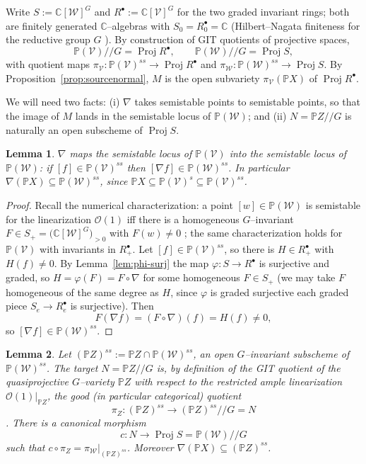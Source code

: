 \documentclass{amsart}
\newtheorem{lemma}{Lemma}
\theoremstyle{definition}
\DeclareMathOperator{\Proj}{Proj}
\newcommand{\PP}{\mathbb{P}}
\newcommand{\CC}{\mathbb{C}}
\newcommand{\nab}{\nabla}
\begin{document}
Write $S:=\CC[\mathcal W]^{G}$ and $R^{\bullet}:=\CC[\mathcal V]^{G}$ for the two graded
invariant rings; both are finitely generated $\CC$--algebras with $S_0=R^{\bullet}_0=\CC$
(Hilbert--Nagata finiteness for the reductive group $G$ \cite[Ch.~1, \S 2, Thm.~1.1]{MFK}).
By construction of GIT quotients of projective spaces,
\[
\PP(\mathcal V)/\!/G=\Proj R^{\bullet},\qquad \PP(\mathcal W)/\!/G=\Proj S ,
\]
with quotient maps $\pi_{\mathcal V}\colon\PP(\mathcal V)^{ss}\to\Proj R^{\bullet}$ and
$\pi_{\mathcal W}\colon\PP(\mathcal W)^{ss}\to\Proj S$. By Proposition~\ref{prop:sourcenormal},
$M$ is the open subvariety $\pi_{\mathcal V}(\PP X)$ of $\Proj R^{\bullet}$.

We will need two facts: (i) $\nab$ takes semistable points to semistable points, so that the
image of $M$ lands in the semistable locus of $\PP(\mathcal W)$; and (ii) $N=\PP Z/\!/G$ is
naturally an open subscheme of $\Proj S$.

\begin{lemma}\label{lem:ss-to-ss}
$\nab$ maps the semistable locus of $\PP(\mathcal V)$ into the semistable locus of
$\PP(\mathcal W)$: if $[f]\in\PP(\mathcal V)^{ss}$ then $[\nab f]\in\PP(\mathcal W)^{ss}$. In
particular $\nab(\PP X)\subseteq\PP(\mathcal W)^{ss}$, since
$\PP X\subseteq\PP(\mathcal V)^{s}\subseteq\PP(\mathcal V)^{ss}$.
\end{lemma}

\begin{proof}
Recall the numerical characterization: a point $[w]\in\PP(\mathcal W)$ is semistable for the
linearization $\mathcal O(1)$ iff there is a homogeneous $G$--invariant $F\in S_{+}=
\big(\CC[\mathcal W]^{G}\big)_{>0}$ with $F(w)\neq 0$ \cite[Ch.~1, \S 4, Thm.~1.10 and
Def.~1.7]{MFK}; the same characterization holds for $\PP(\mathcal V)$ with invariants in
$R^{\bullet}_{+}$. Let $[f]\in\PP(\mathcal V)^{ss}$, so there is $H\in R^{\bullet}_{+}$ with
$H(f)\neq 0$. By Lemma~\ref{lem:phi-surj} the map $\varphi\colon S\to R^{\bullet}$ is
surjective and graded, so $H=\varphi(F)=F\circ\nab$ for some homogeneous
$F\in S_{+}$ (we may take $F$ homogeneous of the same degree as $H$, since $\varphi$ is graded
surjective each graded piece $S_e\to R^\bullet_e$ is surjective). Then
\[
F(\nab f)=(F\circ\nab)(f)=H(f)\neq 0 ,
\]
so $[\nab f]\in\PP(\mathcal W)^{ss}$.
\end{proof}

\begin{lemma}\label{lem:Ncat}
Let $(\PP Z)^{ss}:=\PP Z\cap\PP(\mathcal W)^{ss}$, an open $G$--invariant subscheme of
$\PP(\mathcal W)^{ss}$. The target $N=\PP Z/\!/G$ is, by definition of the GIT quotient of the
quasiprojective $G$--variety $\PP Z$ with respect to the restricted ample linearization
$\mathcal O(1)|_{\PP Z}$, the \emph{good} \textup{(}in particular categorical\textup{)}
quotient
\[
\pi_Z\colon (\PP Z)^{ss}\longrightarrow (\PP Z)^{ss}/\!/G=N
\]
\textup{\cite[Ch.~1, \S 4, Thm.~1.10 and the construction of $/\!/$ for invariant opens]{MFK}}.
There is a canonical morphism
\[
c\colon N\longrightarrow \Proj S=\PP(\mathcal W)/\!/G
\]
such that $c\circ\pi_Z=\pi_{\mathcal W}|_{(\PP Z)^{ss}}$. Moreover
$\nab(\PP X)\subseteq (\PP Z)^{ss}$.
\end{lemma}
\end{document}
